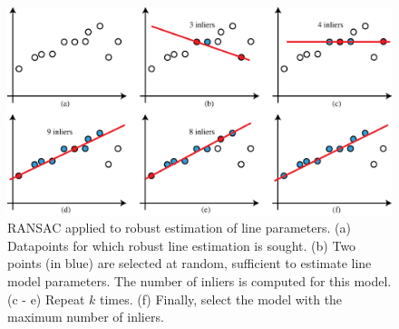 \begin{figure}[t]
\centerline{
\includegraphics[width=1\linewidth]{figures/homography/ransac_algo.eps}
}
\caption{RANSAC applied to robust estimation of line parameters. (a) Datapoints for which robust line estimation is sought. (b) Two points (in blue) are selected at random, sufficient to estimate line model parameters. The number of inliers is computed for this model. (c - e) Repeat $k$ times. (f) Finally, select the model with the maximum number of inliers.}
\label{fig:ransac}
\end{figure}

